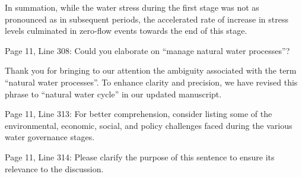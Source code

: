 \AR*{} In summation, while the water stress during the first stage was not as pronounced as in subsequent periods, the accelerated rate of increase in stress levels culminated in zero-flow events towards the end of this stage.

\RC{} Page 11, Line 308: Could you elaborate on ``manage natural water processes''?

\AR{} Thank you for bringing to our attention the ambiguity associated with the term ``natural water processes''. To enhance clarity and precision, we have revised this phrase to ``natural water cycle'' in our updated manuscript.

\RC{} Page 11, Line 313: For better comprehension, consider listing some of the environmental, economic, social, and policy challenges faced during the various water governance stages.

\RC{} Page 11, Line 314: Please clarify the purpose of this sentence to ensure its relevance to the discussion.
